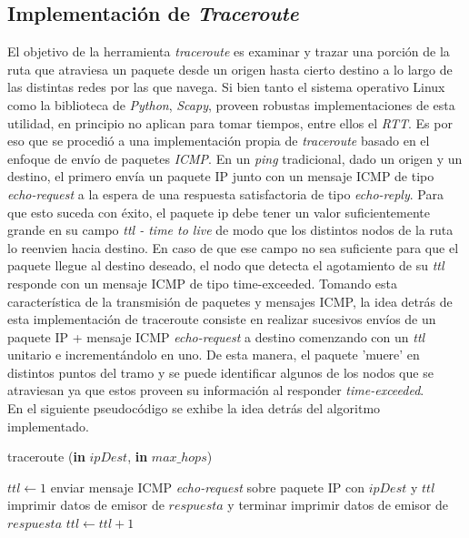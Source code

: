 \subsection{Implementación de \textsl{Traceroute}}

El objetivo de la herramienta \textsl{traceroute} es examinar y trazar una porción de la ruta que atraviesa un paquete desde un origen hasta cierto destino a lo largo de las distintas redes por las que navega. Si bien tanto el sistema operativo Linux como la biblioteca de \textit{Python}, \textsl{Scapy}, proveen robustas implementaciones de esta utilidad, en principio no aplican para tomar tiempos, entre ellos el \textit{RTT}. Es por eso que se procedió a una implementación propia de \textsl{traceroute} basado en el enfoque de envío de paquetes \textit{ICMP}. En un \textit{ping} tradicional, dado un origen y un destino, el primero envía un paquete IP junto con un mensaje ICMP de tipo \textit{echo-request} a la espera de una respuesta satisfactoria de tipo \textit{echo-reply}. Para que esto suceda con éxito, el paquete ip debe tener un valor suficientemente grande en su campo \textit{ttl - time to live} de modo que los distintos nodos de la ruta lo reenvien hacia destino. En caso de que ese campo no sea suficiente para que el paquete llegue al destino deseado, el nodo que detecta el agotamiento de su \textit{ttl} responde con un mensaje ICMP de tipo {time-exceeded}. Tomando esta característica de la transmisión de paquetes y mensajes ICMP, la idea detrás de esta implementación de traceroute consiste en realizar sucesivos envíos de un paquete IP + mensaje ICMP \textit{echo-request} a destino comenzando con un \textit{ttl} unitario e incrementándolo en uno. De esta manera, el paquete 'muere' en distintos puntos del tramo y se puede identificar algunos de los nodos que se atraviesan ya que estos proveen su información al responder \textit{time-exceeded}.\\
\indent En el siguiente pseudocódigo se exhibe la idea detrás del algoritmo implementado.\\

\begin{algorithm}
\caption{traceroute (\textbf{in} $ipDest$, \textbf{in} $max\_hops$)}
\begin{algorithmic}[1]

\STATE $ttl \leftarrow 1$
	\STATE enviar mensaje ICMP \textsl{echo-request} sobre paquete IP con $ipDest$ y $ttl$
			\STATE imprimir datos de emisor de $respuesta$ y terminar
		\ELSE
			\STATE imprimir datos de emisor de $respuesta$
		\ENDIF
	\ENDIF
	\STATE $ttl \leftarrow ttl + 1$
\ENDWHILE
\end{algorithmic}
\end{algorithm}

